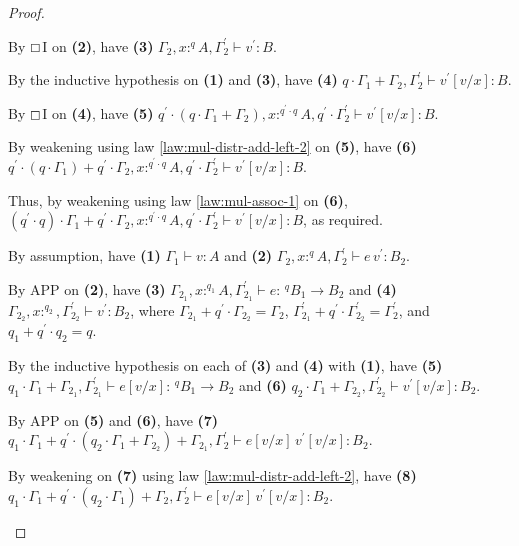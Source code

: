 \documentclass[acmsmall,screen,nonacm]{acmart}
\newcommand{\tee}{\vdash}
\begin{document}
\begin{proof}
\begin{description}
    By $\boxempty$I on \textbf{(2)}, have \textbf{(3)} $\Gamma_2, x :^q A, \Gamma_2^\prime \tee v^\prime : B$.

    By the inductive hypothesis on \textbf{(1)} and \textbf{(3)}, have \textbf{(4)} $q \cdot \Gamma_1 + \Gamma_2, \Gamma_2^\prime \tee v^\prime[v/x] : B$.
    
    By $\boxempty$I on \textbf{(4)}, have \textbf{(5)} $q^\prime \cdot (q \cdot \Gamma_1 + \Gamma_2), x :^{q^\prime \cdot q} A, q^\prime \cdot \Gamma_2^\prime \tee v^\prime[v/x] : B$.
    
    By weakening using law \ref{law:mul-distr-add-left-2} on \textbf{(5)}, have \textbf{(6)} $q^\prime \cdot (q \cdot \Gamma_1) + q^\prime \cdot \Gamma_2, x :^{q^\prime \cdot q} A, q^\prime \cdot \Gamma_2^\prime \tee v^\prime[v/x] : B$.
    
    Thus, by weakening using law \ref{law:mul-assoc-1} on \textbf{(6)}, $(q^\prime \cdot q) \cdot \Gamma_1 + q^\prime \cdot \Gamma_2, x :^{q^\prime \cdot q} A, q^\prime \cdot \Gamma_2^\prime \tee v^\prime[v/x] : B$, as required.
    \\
    \item[Case APP.] 
    By assumption, have \textbf{(1)} $\Gamma_1 \tee v : A$ and \textbf{(2)} $\Gamma_2, x :^q A, \Gamma_2^\prime \tee e \, v^\prime : B_2$.
    
    By APP on \textbf{(2)}, have \textbf{(3)} $\Gamma_{2_1}, x :^{q_1} A, \Gamma_{2_1}^\prime \tee e : \,^q B_1 \rightarrow B_2$ and \textbf{(4)} $\Gamma_{2_2}, x :^{q_2}, \Gamma_{2_2}^\prime \tee v^\prime : B_2$, where $\Gamma_{2_1} + q^\prime \cdot \Gamma_{2_2} = \Gamma_2$, $\Gamma_{2_1}^\prime + q^\prime \cdot \Gamma_{2_2}^\prime = \Gamma_2^\prime$, and $q_1 + q^\prime \cdot q_2 = q$.

    By the inductive hypothesis on each of \textbf{(3)} and \textbf{(4)} with \textbf{(1)}, have \textbf{(5)} $q_1 \cdot \Gamma_1 + \Gamma_{2_1}, \Gamma_{2_1}^\prime \tee e[v/x] : \,^q B_1 \rightarrow B_2$ and \textbf{(6)} $q_2 \cdot \Gamma_1 + \Gamma_{2_2}, \Gamma_{2_2}^\prime \tee v^\prime[v/x] : B_2$.

    By APP on \textbf{(5)} and \textbf{(6)}, have \textbf{(7)} $q_1 \cdot \Gamma_1 + q^\prime \cdot (q_2 \cdot \Gamma_1 + \Gamma_{2_2}) + \Gamma_{2_1}, \Gamma_2^\prime \tee e[v/x] \, v^\prime[v/x] : B_2$.
    
    By weakening on \textbf{(7)} using law \ref{law:mul-distr-add-left-2}, have \textbf{(8)} $q_1 \cdot \Gamma_1 + q^\prime \cdot (q_2 \cdot \Gamma_1) + \Gamma_2, \Gamma_2^\prime \tee e[v/x] \, v^\prime[v/x] : B_2$.
    

\end{description}
\end{proof}
\end{document}
